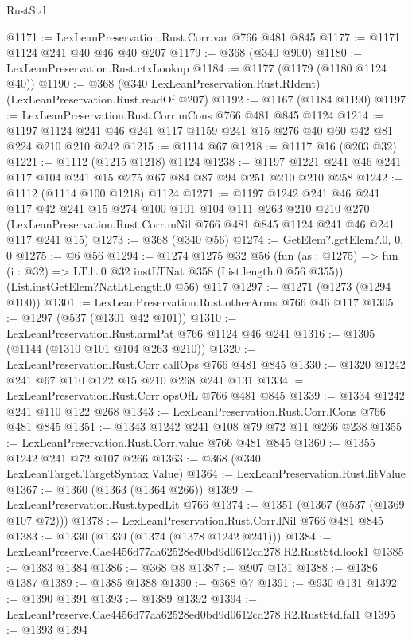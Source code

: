 \begin{lexlean}{RustStd}
\begin{coremodule}
@1171 := LexLeanPreservation.Rust.Corr.var @766 @481 @845
@1177 := @1171 @1124 @241 @40 @46 @40 @207
@1179 := @368 (@340 @900)
@1180 := LexLeanPreservation.Rust.ctxLookup
@1184 := @1177 (@1179 (@1180 @1124 @40))
@1190 := @368 (@340 LexLeanPreservation.Rust.RIdent) (LexLeanPreservation.Rust.readOf @207)
@1192 := @1167 (@1184 @1190)
@1197 := LexLeanPreservation.Rust.Corr.mCons @766 @481 @845 @1124
@1214 := @1197 @1124 @241 @46 @241 @117 @1159 @241 @15 @276 @40 @60 @42 @81 @224 @210 @210 @242
@1215 := @1114 @67
@1218 := @1117 @16 (@203 @32)
@1221 := @1112 (@1215 @1218) @1124
@1238 := @1197 @1221 @241 @46 @241 @117 @104 @241 @15 @275 @67 @84 @87 @94 @251 @210 @210 @258
@1242 := @1112 (@1114 @100 @1218) @1124
@1271 := @1197
    @1242
    @241
    @46
    @241
    @117
    @42
    @241
    @15
    @274
    @100
    @101
    @104
    @111
    @263
    @210
    @210
    @270
    (LexLeanPreservation.Rust.Corr.mNil @766 @481 @845 @1124 @241 @46 @241 @117 @241 @15)
@1273 := @368 (@340 @56)
@1274 := GetElem?.getElem?.{0, 0, 0}
@1275 := @6 @56
@1294 := @1274
    @1275
    @32
    @56
    (fun (as : @1275) => fun (i : @32) => LT.lt.{0} @32 instLTNat @358 (List.length.{0} @56 @355))
    (List.instGetElem?NatLtLength.{0} @56)
    @117
@1297 := @1271 (@1273 (@1294 @100))
@1301 := LexLeanPreservation.Rust.otherArms @766 @46 @117
@1305 := @1297 (@537 (@1301 @42 @101))
@1310 := LexLeanPreservation.Rust.armPat @766 @1124 @46 @241
@1316 := @1305 (@1144 (@1310 @101 @104 @263 @210))
@1320 := LexLeanPreservation.Rust.Corr.callOps @766 @481 @845
@1330 := @1320 @1242 @241 @67 @110 @122 @15 @210 @268 @241 @131
@1334 := LexLeanPreservation.Rust.Corr.opsOfL @766 @481 @845
@1339 := @1334 @1242 @241 @110 @122 @268
@1343 := LexLeanPreservation.Rust.Corr.lCons @766 @481 @845
@1351 := @1343 @1242 @241 @108 @79 @72 @11 @266 @238
@1355 := LexLeanPreservation.Rust.Corr.value @766 @481 @845
@1360 := @1355 @1242 @241 @72 @107 @266
@1363 := @368 (@340 LexLeanTarget.TargetSyntax.Value)
@1364 := LexLeanPreservation.Rust.litValue
@1367 := @1360 (@1363 (@1364 @266))
@1369 := LexLeanPreservation.Rust.typedLit @766
@1374 := @1351 (@1367 (@537 (@1369 @107 @72)))
@1378 := LexLeanPreservation.Rust.Corr.lNil @766 @481 @845
@1383 := @1330 (@1339 (@1374 (@1378 @1242 @241)))
@1384 := LexLeanPreserve.Cae4456d77aa62528ed0bd9d0612cd278.R2.RustStd.look1
@1385 := @1383 @1384
@1386 := @368 @8
@1387 := @907 @131
@1388 := @1386 @1387
@1389 := @1385 @1388
@1390 := @368 @7
@1391 := @930 @131
@1392 := @1390 @1391
@1393 := @1389 @1392
@1394 := LexLeanPreserve.Cae4456d77aa62528ed0bd9d0612cd278.R2.RustStd.fal1
@1395 := @1393 @1394

\end{coremodule}
\end{lexlean}

